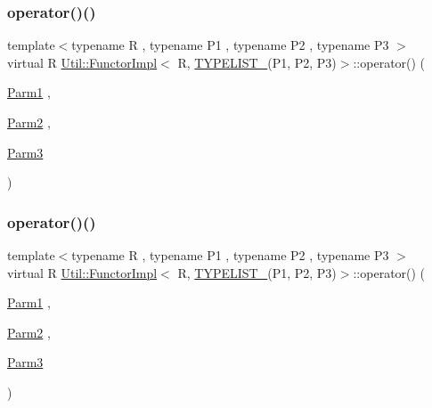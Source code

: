 \subsubsection{\texorpdfstring{operator()()}{operator()()}\hspace{0.1cm}{\footnotesize\ttfamily [1/3]}}
{\footnotesize\ttfamily template$<$typename R , typename P1 , typename P2 , typename P3 $>$ \\
virtual R \mbox{\hyperlink{classUtil_1_1FunctorImpl}{Util\+::\+Functor\+Impl}}$<$ R, \mbox{\hyperlink{adat__devel__install_2include_2adat_2typelist_8h_a0309f68a543c5c0994f9edc0e56dc59f}{T\+Y\+P\+E\+L\+I\+S\+T\+\_}}(P1, P2, P3)$>$\+::operator() (\begin{DoxyParamCaption}\item[{\mbox{\hyperlink{structUtil_1_1Private_1_1FunctorImplBase_a9d61e693d6c616dea5bd9d9073c7d21a}{Parm1}}}]{,  }\item[{\mbox{\hyperlink{structUtil_1_1Private_1_1FunctorImplBase_a554085cd798ef14838a59b528f0feb2e}{Parm2}}}]{,  }\item[{\mbox{\hyperlink{structUtil_1_1Private_1_1FunctorImplBase_a052148e627fd4caecbcffdbdf1033dbb}{Parm3}}}]{ }\end{DoxyParamCaption})\hspace{0.3cm}{\ttfamily [pure virtual]}}

\mbox{\label{classUtil_1_1FunctorImpl_3_01R_00_01TYPELIST__3_07P1_00_01P2_00_01P3_08_4_a80ceaa256d42f98c4523dea840906200}} 
\subsubsection{\texorpdfstring{operator()()}{operator()()}\hspace{0.1cm}{\footnotesize\ttfamily [2/3]}}
{\footnotesize\ttfamily template$<$typename R , typename P1 , typename P2 , typename P3 $>$ \\
virtual R \mbox{\hyperlink{classUtil_1_1FunctorImpl}{Util\+::\+Functor\+Impl}}$<$ R, \mbox{\hyperlink{adat__devel__install_2include_2adat_2typelist_8h_a0309f68a543c5c0994f9edc0e56dc59f}{T\+Y\+P\+E\+L\+I\+S\+T\+\_}}(P1, P2, P3)$>$\+::operator() (\begin{DoxyParamCaption}\item[{\mbox{\hyperlink{structUtil_1_1Private_1_1FunctorImplBase_a9d61e693d6c616dea5bd9d9073c7d21a}{Parm1}}}]{,  }\item[{\mbox{\hyperlink{structUtil_1_1Private_1_1FunctorImplBase_a554085cd798ef14838a59b528f0feb2e}{Parm2}}}]{,  }\item[{\mbox{\hyperlink{structUtil_1_1Private_1_1FunctorImplBase_a052148e627fd4caecbcffdbdf1033dbb}{Parm3}}}]{ }\end{DoxyParamCaption})\hspace{0.3cm}{\ttfamily [pure virtual]}}

